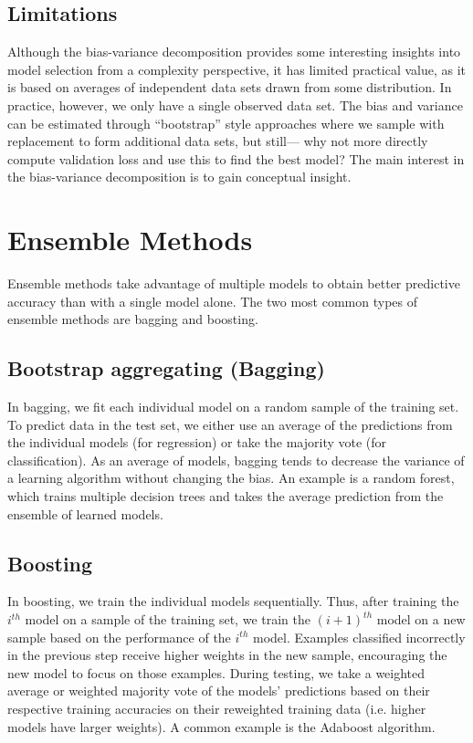 \documentclass[12pt,letterpaper]{article}
\begin{document}
\subsection{Limitations}
Although the bias-variance decomposition provides some interesting insights into model selection from a complexity perspective, it has limited practical value, as it is based on averages of independent data sets drawn from some distribution. In practice, however, we only have a single observed data set.
The bias and variance can be estimated through ``bootstrap'' style
approaches where we sample with replacement to form additional 
data sets, but still--- why not more directly compute validation loss
and use this to find the best model? The main interest in the bias-variance decomposition is to gain conceptual insight. 

\section{Ensemble Methods}
Ensemble methods take advantage of multiple models to obtain better predictive accuracy than with a single model alone. The two most common types of ensemble methods are bagging and boosting. 

\subsection{Bootstrap aggregating (Bagging)}
In bagging, we fit each individual model on a random sample of the training set. To predict data in the test set, we either use an average of the predictions from the individual models (for regression) or take the majority vote (for classification). As an average of models, bagging tends to decrease the variance of a learning algorithm without changing the bias. An example is a random forest, which trains multiple decision trees and takes the average prediction from the ensemble of learned models.

\subsection{Boosting}

In boosting, we train the individual models sequentially. Thus, after training the $i^{th}$ model on a sample of the training set, we train the $(i+1)^{th}$ model on a new sample based on the performance of the $i^{th}$ model. Examples classified incorrectly in the previous step receive higher weights in the new sample, encouraging the new model to focus on those examples. During testing, we take a weighted average or weighted majority vote of the models' predictions based on their respective training accuracies on their reweighted training data (i.e. higher models have larger weights). A common example is the Adaboost algorithm.
\end{document}
